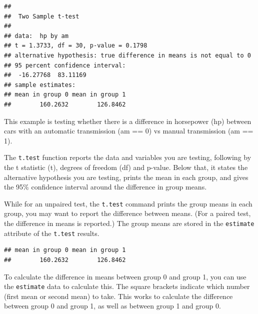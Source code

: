 \documentclass[]{book}
\newenvironment{Shaded}{\begin{snugshade}}{\end{snugshade}}
\newcommand{\DataTypeTok}[1]{\textcolor[rgb]{0.13,0.29,0.53}{#1}}
\newcommand{\DecValTok}[1]{\textcolor[rgb]{0.00,0.00,0.81}{#1}}
\newcommand{\KeywordTok}[1]{\textcolor[rgb]{0.13,0.29,0.53}{\textbf{#1}}}
\newcommand{\NormalTok}[1]{#1}
\newcommand{\OperatorTok}[1]{\textcolor[rgb]{0.81,0.36,0.00}{\textbf{#1}}}
\newcommand{\OtherTok}[1]{\textcolor[rgb]{0.56,0.35,0.01}{#1}}
\newcommand{\StringTok}[1]{\textcolor[rgb]{0.31,0.60,0.02}{#1}}
\begin{document}
\begin{verbatim}
## 
##  Two Sample t-test
## 
## data:  hp by am
## t = 1.3733, df = 30, p-value = 0.1798
## alternative hypothesis: true difference in means is not equal to 0
## 95 percent confidence interval:
##  -16.27768  83.11169
## sample estimates:
## mean in group 0 mean in group 1 
##        160.2632        126.8462
\end{verbatim}

This example is testing whether there is a difference in horsepower (hp)
between cars with an automatic transmission (am == 0) vs manual
transmission (am == 1).

The \texttt{t.test} function reports the data and variables you are
testing, following by the t statistic (t), degrees of freedom (df) and
p-value. Below that, it states the alternative hypothesis you are
testing, prints the mean in each group, and gives the 95\% confidence
interval around the difference in group means.

While for an unpaired test, the \texttt{t.test} command prints the group
means in each group, you may want to report the difference between
means. (For a paired test, the difference in means is reported.) The
group means are stored in the \texttt{estimate} attribute of the
\texttt{t.test} results.

\begin{Shaded}
\end{Shaded}

\begin{verbatim}
## mean in group 0 mean in group 1 
##        160.2632        126.8462
\end{verbatim}

To calculate the difference in means between group 0 and group 1, you
can use the \texttt{estimate} data to calculate this. The square
brackets indicate which number (first mean or second mean) to take. This
works to calculate the difference between group 0 and group 1, as well
as between group 1 and group 0.

\begin{Shaded}
\end{Shaded}
\end{document}
